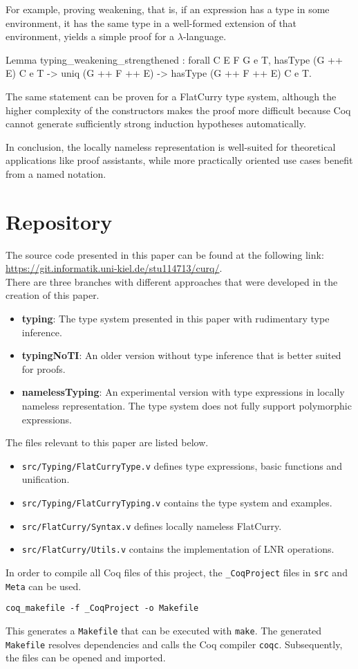 \documentclass[a4paper, 11pt, fleqn]{scrreprt}
\newcommand{\coqinline}[1]{\texttt{#1}}
\begin{document}
	\par
	 For example, proving weakening, that is, if an expression has a type in some environment, it has the same type in a well-formed extension of that environment, yields a simple proof for a $\lambda$-language.
	 \newpage
	\begin{coqcode}
Lemma typing_weakening_strengthened : forall C E F G e T,
  hasType (G ++ E) C e T -> uniq (G ++ F ++ E) ->
  hasType (G ++ F ++ E) C e T.
	\end{coqcode}
	The same statement can be proven for a FlatCurry type system, although the higher complexity of the constructors makes the proof more difficult because Coq cannot  generate sufficiently strong induction hypotheses automatically. 
	\par
	In conclusion, the locally nameless representation is well-suited for theoretical applications like proof assistants, while more practically oriented use cases benefit from a named notation.


\appendix
\chapter{Repository}
\label{usage}
The source code presented in this paper can be found at the following link: \\ \url{https://git.informatik.uni-kiel.de/stu114713/curq/}. \\ There are three branches with different approaches that were developed in the creation of this paper.
\begin{itemize}
	\item \textbf{typing}: The type system presented in this paper with rudimentary type inference.
	\item \textbf{typingNoTI}: An older version without type inference that is better suited for proofs.
	\item \textbf{namelessTyping}: An experimental version with type expressions in locally nameless representation. The type system does not fully support polymorphic expressions.
\end{itemize}
The files relevant to this paper are listed below.
\begin{itemize}
	\item \coqinline{src/Typing/FlatCurryType.v} defines type expressions, basic functions and unification.
	\item \coqinline{src/Typing/FlatCurryTyping.v} contains the type system and examples.
	\item \coqinline{src/FlatCurry/Syntax.v} defines locally nameless FlatCurry.
	\item \coqinline{src/FlatCurry/Utils.v} contains the implementation of LNR operations.
\end{itemize}
In order to compile all Coq files of this project, the \texttt{\_CoqProject} files in \coqinline{src} and \coqinline{Meta} can be used.
\begin{verbatim}
coq_makefile -f _CoqProject -o Makefile
\end{verbatim}
This generates a \texttt{Makefile} that can be executed with \texttt{make}. The generated \texttt{Makefile} resolves dependencies and calls the Coq compiler \texttt{coqc}. Subsequently, the files can be opened and imported.
\end{document}
